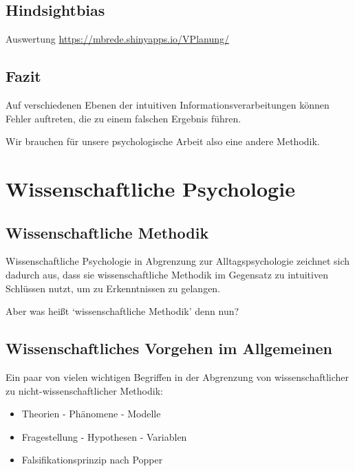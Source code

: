 \documentclass[
]{book}
\providecommand{\tightlist}{%
  \setlength{\itemsep}{0pt}\setlength{\parskip}{0pt}}
\begin{document}
\hypertarget{hindsightbias}{%
\subsection{Hindsightbias}\label{hindsightbias}}

Auswertung \href{hier}{https://mbrede.shinyapps.io/VPlanung/}

\hypertarget{fazit}{%
\subsection{Fazit}\label{fazit}}

Auf verschiedenen Ebenen der intuitiven Informationsverarbeitungen können Fehler auftreten, die zu einem falschen Ergebnis führen.

Wir brauchen für unsere psychologische Arbeit also eine andere Methodik.

\hypertarget{wissenschaftliche-psychologie}{%
\section{Wissenschaftliche Psychologie}\label{wissenschaftliche-psychologie}}

\hypertarget{wissenschaftliche-methodik}{%
\subsection{Wissenschaftliche Methodik}\label{wissenschaftliche-methodik}}

Wissenschaftliche Psychologie in Abgrenzung zur Alltagspsychologie zeichnet sich dadurch aus, dass sie wissenschaftliche Methodik im Gegensatz zu intuitiven Schlüssen nutzt, um zu Erkenntnissen zu gelangen.

Aber was heißt `wissenschaftliche Methodik' denn nun?

\hypertarget{wissenschaftliches-vorgehen-im-allgemeinen}{%
\subsection{Wissenschaftliches Vorgehen im Allgemeinen}\label{wissenschaftliches-vorgehen-im-allgemeinen}}

Ein paar von vielen wichtigen Begriffen in der Abgrenzung von wissenschaftlicher zu nicht-wissenschaftlicher Methodik:

\begin{itemize}
\tightlist
\item
  Theorien - Phänomene - Modelle
\item
  Fragestellung - Hypothesen - Variablen \smallskip
\item
  Falsifikationsprinzip nach Popper \smallskip
\end{itemize}
\end{document}
